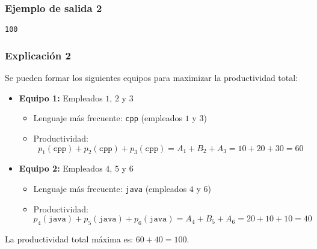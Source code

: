 \subsubsection*{Ejemplo de salida 2}

\begin{verbatim}
100
\end{verbatim}

\subsubsection*{Explicación 2}

Se pueden formar los siguientes equipos para maximizar la productividad total:

\begin{itemize}
    \item \textbf{Equipo 1:} Empleados $1$, $2$ y $3$
        \begin{itemize}
            \item Lenguaje más frecuente: \texttt{cpp} (empleados $1$ y $3$)
            \item Productividad: 
            \[
            p_1(\texttt{cpp}) + p_2(\texttt{cpp}) + p_3(\texttt{cpp})
            = A_1 + B_2 + A_3 = 10 + 20 + 30 = 60
            \]
        \end{itemize}
    \item \textbf{Equipo 2:} Empleados $4$, $5$ y $6$
        \begin{itemize}
            \item Lenguaje más frecuente: \texttt{java} (empleados $4$ y $6$)
            \item Productividad:
            \[
            p_4(\texttt{java}) + p_5(\texttt{java}) + p_6(\texttt{java})
            = A_4 + B_5 + A_6 = 20 + 10 + 10 = 40
            \]
        \end{itemize}
\end{itemize}

La productividad total máxima es: $60 + 40 = 100$.